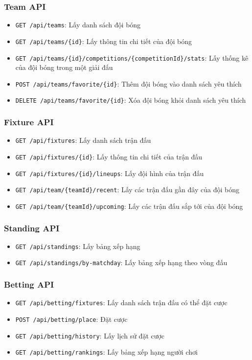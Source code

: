 \documentclass[a4paper,12pt]{report}
\begin{document}
\subsubsection{Team API}
\begin{itemize}
    \item \texttt{GET /api/teams}: Lấy danh sách đội bóng
    \item \texttt{GET /api/teams/\{id\}}: Lấy thông tin chi tiết của đội bóng
    \item \texttt{GET /api/teams/\{id\}/competitions/\{competitionId\}/stats}: Lấy thống kê của đội bóng trong một giải đấu
    \item \texttt{POST /api/teams/favorite/\{id\}}: Thêm đội bóng vào danh sách yêu thích
    \item \texttt{DELETE /api/teams/favorite/\{id\}}: Xóa đội bóng khỏi danh sách yêu thích
\end{itemize}

\subsubsection{Fixture API}
\begin{itemize}
    \item \texttt{GET /api/fixtures}: Lấy danh sách trận đấu
    \item \texttt{GET /api/fixtures/\{id\}}: Lấy thông tin chi tiết của trận đấu
    \item \texttt{GET /api/fixtures/\{id\}/lineups}: Lấy đội hình của trận đấu
    \item \texttt{GET /api/team/\{teamId\}/recent}: Lấy các trận đấu gần đây của đội bóng
    \item \texttt{GET /api/team/\{teamId\}/upcoming}: Lấy các trận đấu sắp tới của đội bóng
\end{itemize}

\subsubsection{Standing API}
\begin{itemize}
    \item \texttt{GET /api/standings}: Lấy bảng xếp hạng
    \item \texttt{GET /api/standings/by-matchday}: Lấy bảng xếp hạng theo vòng đấu
\end{itemize}

\subsubsection{Betting API}
\begin{itemize}
    \item \texttt{GET /api/betting/fixtures}: Lấy danh sách trận đấu có thể đặt cược
    \item \texttt{POST /api/betting/place}: Đặt cược
    \item \texttt{GET /api/betting/history}: Lấy lịch sử đặt cược
    \item \texttt{GET /api/betting/rankings}: Lấy bảng xếp hạng người chơi
\end{itemize}
\end{document}
